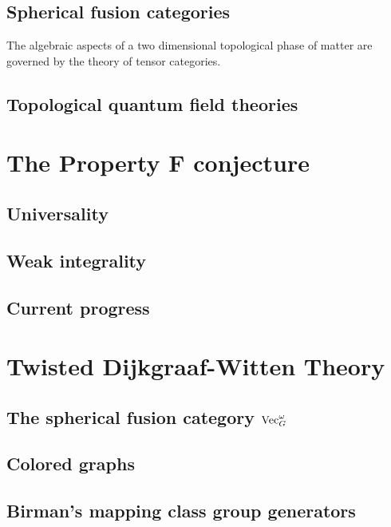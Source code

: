 \subsection{Spherical fusion categories}

The algebraic aspects of a two dimensional topological phase of matter are governed by the theory of tensor categories.    


\subsection{Topological quantum field theories}


\section{The Property F conjecture}
\subsection{Universality}
\subsection{Weak integrality}
\subsection{Current progress}

\section{Twisted Dijkgraaf-Witten Theory}
\subsection{The spherical fusion category $\operatorname{Vec}^\omega_G$}
\subsection{Colored graphs}
\subsection{Birman's mapping class group generators}




